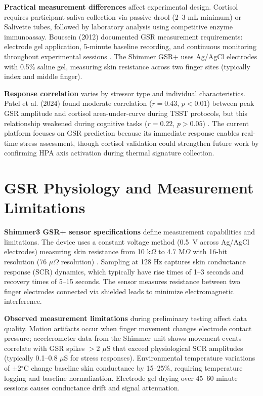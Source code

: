\textbf{Practical measurement differences} affect experimental design. Cortisol requires participant saliva collection via passive drool (2--3 mL minimum) or Salivette tubes, followed by laboratory analysis using competitive enzyme immunoassay. Boucsein (2012) documented GSR measurement requirements: electrode gel application, 5-minute baseline recording, and continuous monitoring throughout experimental sessions \cite{ref1}. The Shimmer GSR+ uses Ag/AgCl electrodes with 0.5\% saline gel, measuring skin resistance across two finger sites (typically index and middle finger).

\textbf{Response correlation} varies by stressor type and individual characteristics. Patel et al. (2024) found moderate correlation ($r = 0.43$, $p < 0.01$) between peak GSR amplitude and cortisol area-under-curve during TSST protocols, but this relationship weakened during cognitive tasks ($r = 0.22$, $p > 0.05$) \cite{ref7}. The current platform focuses on GSR prediction because its immediate response enables real-time stress assessment, though cortisol validation could strengthen future work by confirming HPA axis activation during thermal signature collection.

\section{GSR Physiology and Measurement Limitations}
\textbf{Shimmer3 GSR+ sensor specifications} define measurement capabilities and limitations. The device uses a constant voltage method (0.5~V across Ag/AgCl electrodes) measuring skin resistance from 10 k$\Omega$ to 4.7 M$\Omega$ with 16-bit resolution (76 $\mu\Omega$ resolution) \cite{ref8}. Sampling at 128 Hz captures skin conductance response (SCR) dynamics, which typically have rise times of 1--3 seconds and recovery times of 5--15 seconds. The sensor measures resistance between two finger electrodes connected via shielded leads to minimize electromagnetic interference.

\textbf{Observed measurement limitations} during preliminary testing affect data quality. Motion artifacts occur when finger movement changes electrode contact pressure; accelerometer data from the Shimmer unit shows movement events correlate with GSR spikes $>2$ $\mu$S that exceed physiological SCR amplitudes (typically 0.1--0.8 $\mu$S for stress responses). Environmental temperature variations of $\pm$2$^\circ$C change baseline skin conductance by 15--25\%, requiring temperature logging and baseline normalization. Electrode gel drying over 45--60 minute sessions causes conductance drift and signal attenuation.


